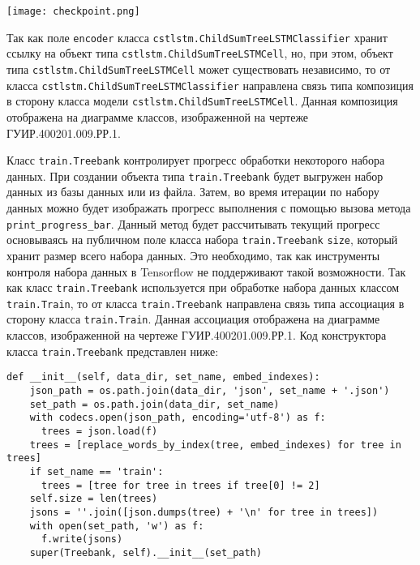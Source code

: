 \begin{center}
  \texttt{[image: checkpoint.png]}
  \label{fig:func:checkpoint}
\end{center}

Так как поле \texttt{encoder} класса \texttt{cstlstm.ChildSumTreeLSTMClas\-sifier} хранит ссылку на объект типа \texttt{cstlstm.ChildSumTreeLSTM\-Cell}, но, при этом, объект типа \texttt{cstlstm.ChildSumTreeLSTMCell} может существовать независимо, то от класса \texttt{cstlstm.ChildSumTree\-LS\-TMClassifier} направлена связь типа композиция в сторону класса модели \texttt{cstlstm.ChildSumTreeLSTMCell}. Данная композиция отображена на диаграмме классов, изображенной на чертеже ГУИР.400201.009.РР.1.

Класс \texttt{train.Treebank} контролирует прогресс обработки некоторого набора данных. При создании объекта типа \texttt{train.Treebank} будет выгружен набор данных из базы данных или из файла. Затем, во время итерации по набору данных можно будет изображать прогресс выполнения с помощью вызова метода \texttt{print\_progress\_bar}. Данный метод будет рассчитывать текущий прогресс основываясь на публичном поле класса набора \texttt{train.Treebank} \texttt{size}, который хранит размер всего набора данных. Это необходимо, так как инструменты контроля набора данных в Tensorflow не поддерживают такой возможности. Так как класс \texttt{train.Treebank} используется при обработке набора данных классом \texttt{train.Train}, то от класса \texttt{train.Treebank} направлена связь типа ассоциация в сторону класса \texttt{train.Train}. Данная ассоциация отображена на диаграмме классов, изображенной на чертеже ГУИР.400201.009.РР.1. Код конструктора класса \texttt{tra\-in.Treebank} представлен ниже:
\medskip
\begin{lstlisting}[style=Python]
  def __init__(self, data_dir, set_name, embed_indexes):
    json_path = os.path.join(data_dir, 'json', set_name + '.json')
    set_path = os.path.join(data_dir, set_name)
    with codecs.open(json_path, encoding='utf-8') as f:
      trees = json.load(f)
    trees = [replace_words_by_index(tree, embed_indexes) for tree in trees]
    if set_name == 'train':
      trees = [tree for tree in trees if tree[0] != 2]
    self.size = len(trees)
    jsons = ''.join([json.dumps(tree) + '\n' for tree in trees])
    with open(set_path, 'w') as f:
      f.write(jsons)
    super(Treebank, self).__init__(set_path)
\end{lstlisting}
\medskip

